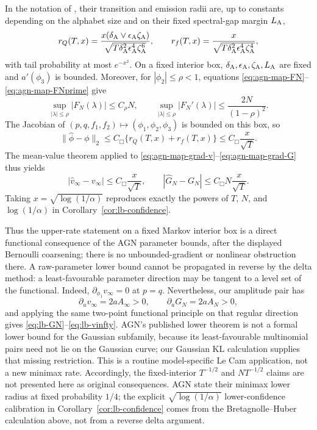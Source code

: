 In the notation of \cite[Theorem~1]{AbrahamGassiatNaulet2023}, their
transition and emission radii are, up to constants depending on the alphabet
size and on their fixed spectral-gap margin \(L_{\rm A}\),
\begin{equation}
 r_Q(T,x)=
 \frac{x(\delta_{\rm A}\vee\epsilon_{\rm A}\zeta_{\rm A})}
 {\sqrt{T\delta_{\rm A}^2\epsilon_{\rm A}^4\zeta_{\rm A}^6}},
 \qquad
 r_f(T,x)=
 \frac{x}
 {\sqrt{T\delta_{\rm A}^2\epsilon_{\rm A}^4\zeta_{\rm A}^4}},
 \label{eq:agn-raw-rates}
\end{equation}
with tail probability at most \(e^{-x^2}\).  On a fixed interior box,
\(\delta_{\rm A},\epsilon_{\rm A},\zeta_{\rm A},L_{\rm A}\) are fixed and
\(a'(\phi_3)\) is bounded.  Moreover, for
\(|\phi_2|\leq\rho<1\), equations
\eqref{eq:agn-map-FN}--\eqref{eq:agn-map-FNprime} give
\[
 \sup_{|\lambda|\leq\rho}|F_N(\lambda)|\leq C_\rho N,
 \qquad
 \sup_{|\lambda|\leq\rho}|F_N'(\lambda)|
 \leq\frac{2N}{(1-\rho)^2}.
\]
The Jacobian of
\((p,q,f_1,f_2)\mapsto(\phi_1,\phi_2,\phi_3)\) is bounded on this box, so
\[
 \|\widehat\phi-\phi\|_2
 \leq C_{\Box}\{r_Q(T,x)+r_f(T,x)\}
 \leq C_{\Box}\frac{x}{\sqrt T}.
\]
The mean-value theorem applied to
\eqref{eq:agn-map-grad-v}--\eqref{eq:agn-map-grad-G} thus yields
\begin{equation}
 |\widehat v_\infty-v_\infty|
 \leq C_{\Box}\frac{x}{\sqrt T},\qquad
 |\widehat G_N-G_N|
 \leq C_{\Box}N\frac{x}{\sqrt T}.
 \label{eq:agn-delta-conclusion}
\end{equation}
Taking \(x=\sqrt{\log(1/\alpha)}\) reproduces exactly the powers of
\(T\), \(N\), and \(\log(1/\alpha)\) in
Corollary~\ref{cor:lb-confidence}.

Thus the upper-rate statement on a fixed Markov interior box is a direct
functional consequence of the AGN parameter bounds, after the displayed
Bernoulli coarsening; there is no unbounded-gradient or nonlinear obstruction
there.  A raw-parameter lower bound cannot be propagated in reverse by the
delta method: a least-favourable parameter direction may be tangent to a level
set of the functional.  Indeed,
\(\partial_{\phi_1}v_\infty=0\) at \(p=q\).  Nevertheless, our amplitude
pair has
\[
 \partial_av_\infty=2aA_\infty>0,
 \qquad \partial_aG_N=2aA_N>0,
\]
and applying the same two-point functional principle on that regular direction
gives \eqref{eq:lb-GN}--\eqref{eq:lb-vinfty}.  AGN's published lower
theorem is not a formal lower bound for the Gaussian subfamily, because its
least-favourable multinomial pairs need not lie on the Gaussian curve; our
Gaussian KL calculation supplies that missing restriction.  This is a routine
model-specific Le Cam application, not a new minimax rate.  Accordingly, the
fixed-interior \(T^{-1/2}\) and \(NT^{-1/2}\) claims are not presented here as
original consequences.  AGN state their minimax lower radius at fixed
probability \(1/4\); the explicit \(\sqrt{\log(1/\alpha)}\) lower-confidence
calibration in Corollary~\ref{cor:lb-confidence} comes from the
Bretagnolle--Huber calculation above, not from a reverse delta argument.

